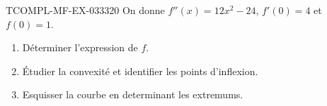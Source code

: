 \begin{exercice}{TCOMPL-MF-EX-033}{3}{20}
On donne $f''(x) = 12x^2 - 24$, $f'(0) = 4$ et $f(0) = 1$.
\begin{enumerate}
  \item Déterminer l'expression de $f$.
  \item Étudier la convexité et identifier les points d'inflexion.
  \item Esquisser la courbe en determinant les extremums.
\end{enumerate}

\end{exercice}

